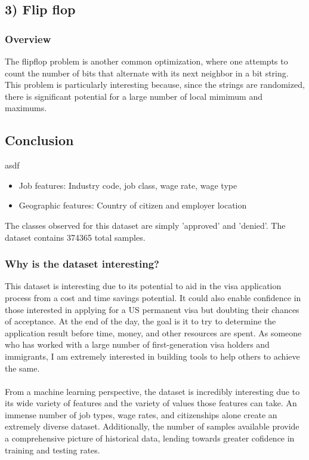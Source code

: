 \documentclass[h]{article}
\begin{document}
\subsection*{3) Flip flop}  
\subsubsection*{Overview}
The flipflop problem is another common optimization, where one attempts to 
count the number of bits that alternate with its next neighbor in a bit string.  
This problem is particularly interesting because, since the strings are 
randomized, there is significant potential for a large number of local mimimum 
and maximums.

\subsection*{ Conclusion}  
asdf

\begin{itemize}
  \item Job features: Industry code, job class, wage rate, wage type
  \item Geographic features: Country of citizen and employer location
\end{itemize}
The classes observed for this dataset are simply 'approved' and 'denied'.  The 
dataset contains 374365 total samples.
\subsubsection*{Why is the dataset interesting?}
This dataset is interesting due to its potential to aid in the visa application 
process from a cost and time savings potential.  It could also enable confidence in those 
interested in applying for a US permanent visa but doubting their chances of 
acceptance.  At the end of the day, the goal is it to try to determine the application result 
before time, money, and other resources are spent.  As someone who has worked 
with a large number of first-generation visa holders and immigrants, I am 
extremely interested in building tools to help others to achieve the same.
\\ \\
From a machine learning perspective, the dataset is incredibly interesting due 
to its wide variety of features and the variety of values those features can take. 
 An immense number of job types, wage rates, and citizenships alone create an 
 extremely diverse dataset.  Additionally, the number of samples available 
 provide a comprehensive picture of historical data, lending towards greater 
 cofidence in training and testing rates.
\end{document}
